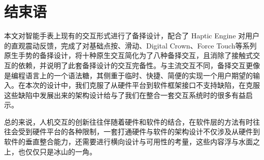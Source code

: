 \section{结束语}

本文对智能手表上现有的交互形式进行了备择设计，配合了 Haptic Engine 对用户的直观震动反馈，完成了对基础点按、滑动、Digital Crown、Force Touch等系列原生手势的备择设计，将十种原生交互简化为了八种备择交互，且消除了接触式交互的依赖，并说明了此套备择设计的交互完备性。与主流交互不同，备择交互更像是编程语言上的一个语法糖，其侧重于临时、快捷、简便的实现一个用户期望的输入。在本次的设计中，我们克服了从硬件平台到软件框架接口不支持缺陷，在克服这些缺陷中发展出来的架构设计给与了我们在整合一套交互系统时的很多有益启示。

总的来说，人机交互的创新往往伴随着硬件和软件的结合，在软件层的方法有时往往会受到硬件平台的各种限制，一套打通硬件与软件的架构设计不仅涉及从硬件到软件的垂直整合能力，还需要进行横向设计与可用性的考量，这些内容浮与水面之上，也仅仅只是冰山的一角。
